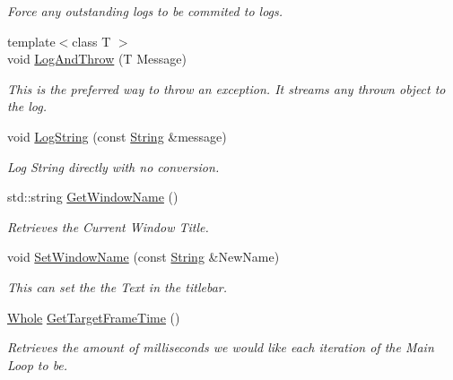 \begin{DoxyCompactItemize}
\begin{DoxyCompactList}\small\item\em Force any outstanding logs to be commited to logs. \item\end{DoxyCompactList}\item 
{\footnotesize template$<$class T $>$ }\\void \hyperlink{classphys_1_1World_a88e6bdee6b972111b6804ca746738c50}{LogAndThrow} (T Message)
\begin{DoxyCompactList}\small\item\em This is the preferred way to throw an exception. It streams any thrown object to the log. \item\end{DoxyCompactList}\item 
void \hyperlink{classphys_1_1World_abf6cb15d85be4e7dcb99db24f979319b}{LogString} (const \hyperlink{namespacephys_aa03900411993de7fbfec4789bc1d392e}{String} \&message)
\begin{DoxyCompactList}\small\item\em Log String directly with no conversion. \item\end{DoxyCompactList}\item 
std::string \hyperlink{classphys_1_1World_a1f0139bbc9561bcf18844be25e4adc73}{GetWindowName} ()
\begin{DoxyCompactList}\small\item\em Retrieves the Current Window Title. \item\end{DoxyCompactList}\item 
void \hyperlink{classphys_1_1World_acd0dff342c08fe3008226488b7c53d97}{SetWindowName} (const \hyperlink{namespacephys_aa03900411993de7fbfec4789bc1d392e}{String} \&NewName)
\begin{DoxyCompactList}\small\item\em This can set the the Text in the titlebar. \item\end{DoxyCompactList}\item 
\hyperlink{namespacephys_a460f6bc24c8dd347b05e0366ae34f34a}{Whole} \hyperlink{classphys_1_1World_aa063ace52be484c7b03ec5859453f48b}{GetTargetFrameTime} ()
\begin{DoxyCompactList}\small\item\em Retrieves the amount of milliseconds we would like each iteration of the Main Loop to be. \item\end{DoxyCompactList}\item 

\end{DoxyCompactItemize}
